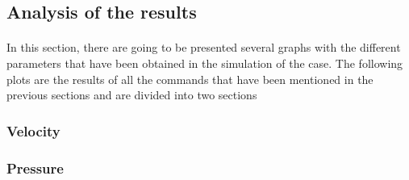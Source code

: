 \subsection{Analysis of the results}

\paragraph{}In this section, there are going to be presented several graphs with the different parameters that have been obtained in the simulation of the case. The following plots are the results of all the commands that have been mentioned in the previous sections and are divided into two sections


\subsubsection{Velocity}




\subsubsection{Pressure}